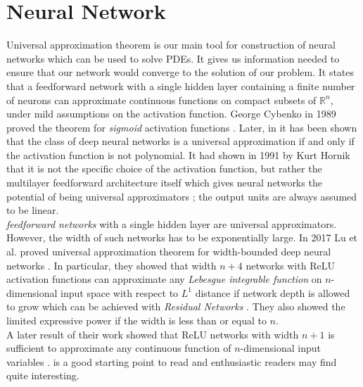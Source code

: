 \section{Neural Network}\label{sec:neural_network}
Universal approximation theorem is our main tool for construction of neural networks which can be used to solve PDEs. It gives us information needed to ensure that our network would converge to the solution of our problem. It states that a feedforward network with a single hidden layer containing a finite number of neurons can approximate continuous functions on compact subsets of $\mathbb{R}^n$, under mild assumptions on the activation function. George Cybenko in 1989 proved the theorem for \textit{sigmoid} activation functions \cite{cybenko1989approximation}. Later, in \cite{li1999alpha} it has been shown that the class of deep neural networks is a universal approximation if and only if the activation function is not polynomial. It had shown in 1991 by Kurt Hornik  that it is not the specific choice of the activation function, but rather the multilayer feedforward architecture itself which gives neural networks the potential of being universal approximators \cite{hofbauer1990adaptive}; the output units are always assumed to be linear. \\
\textit{feedforward networks} with a single hidden layer are universal approximators. However, the width of such networks has to be exponentially large. In 2017 Lu et al. proved universal approximation theorem for width-bounded deep neural networks \cite{lu2017expressive}. In particular, they showed that width $n+4$ networks with ReLU activation functions can approximate any \textit{Lebesgue integrable function} on $n$-dimensional input space with respect to $L^{1}$ distance if network depth is allowed to grow which can be achieved with \textit{Residual Networks} \cite{he2016deep, lin2018resnet}. They also showed the limited expressive power if the width is less than or equal to $n$.\\
A later result of their work showed that ReLU networks with width $n+1$ is sufficient to approximate any continuous function of $n$-dimensional input variables \cite{hanin2017approximating}.
\cite{tikk2003survey} is a good starting point to read and enthusiastic readers may find \cite{kratsios2019universal} quite interesting.


